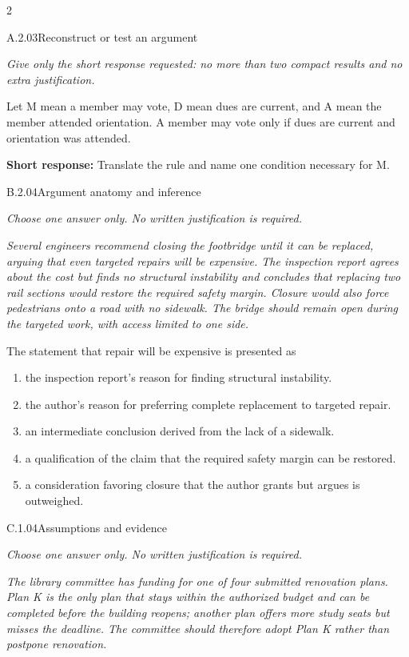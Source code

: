 \documentclass[9pt]{extarticle}
\newcommand{\choice}[1]{\item #1}
\begin{document}
\begin{multicols}{2}
\begin{DenseCoreProblem}{A.2.03}{Reconstruct or test an argument}
{\scriptsize\textit{Give only the short response requested: no more than two compact results and no extra justification.}\par}
Let M mean a member may vote, D mean dues are current, and A mean the member attended orientation. A member may vote only if dues are current and orientation was attended.

\textbf{Short response:} Translate the rule and name one condition necessary for M.
\end{DenseCoreProblem}
\begin{DenseCoreProblem}{B.2.04}{Argument anatomy and inference}
{\scriptsize\textit{Choose one answer only. No written justification is required.}\par}
\emph{Several engineers recommend closing the footbridge until it can be replaced, arguing that even targeted repairs will be expensive. The inspection report agrees about the cost but finds no structural instability and concludes that replacing two rail sections would restore the required safety margin. Closure would also force pedestrians onto a road with no sidewalk. The bridge should remain open during the targeted work, with access limited to one side.}

The statement that repair will be expensive is presented as
\begin{enumerate}[label=(\alph*)]
  \choice{the inspection report's reason for finding structural instability.}
  \choice{the author's reason for preferring complete replacement to targeted repair.}
  \choice{an intermediate conclusion derived from the lack of a sidewalk.}
  \choice{a qualification of the claim that the required safety margin can be restored.}
  \choice{a consideration favoring closure that the author grants but argues is outweighed.}
\end{enumerate}
\end{DenseCoreProblem}
\columnbreak
\begin{DenseCoreProblem}{C.1.04}{Assumptions and evidence}
{\scriptsize\textit{Choose one answer only. No written justification is required.}\par}
\emph{The library committee has funding for one of four submitted renovation plans. Plan K is the only plan that stays within the authorized budget and can be completed before the building reopens; another plan offers more study seats but misses the deadline. The committee should therefore adopt Plan K rather than postpone renovation.}


\end{DenseCoreProblem}
\end{multicols}
\end{document}
